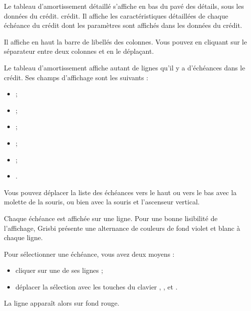 Le tableau d'amortissement détaillé s'affiche en bas du pavé des détails, sous les données du \ifIllustration crédit.
\else crédit.
\fi
 Il affiche les caractéristiques détaillées de chaque échéance du crédit dont les paramètres sont affichés dans les données du crédit.

Il affiche en haut la barre de libellés des colonnes. Vous pouvez  en cliquant sur le séparateur entre deux colonnes et en le déplaçant. 


Le tableau d'amortissement affiche autant de lignes qu'il y a d'échéances dans le crédit. Ses champs d'affichage sont les suivants :

\begin{itemize}
	 \item {} ;
	 \item {} ;
	 \item {} ;
	 \item {} ;
	 \item {} ;
	 \item {}.
\end{itemize}

Vous pouvez déplacer la liste des échéances vers le haut ou vers le bas avec la molette de la souris, ou bien avec la souris et l'ascenseur vertical. 


Chaque échéance est affichée sur une ligne. Pour une bonne lisibilité de l'affichage, Grisbi présente une alternance de couleurs de fond violet et blanc{\couleurs} à chaque ligne.

Pour sélectionner une échéance, vous avez deux moyens :
\begin{itemize}
	 \item cliquer sur une de ses lignes ;
	 \item déplacer la sélection avec les touches du clavier , , et .
\end{itemize}
La ligne apparaît alors sur fond rouge{\couleur}.

